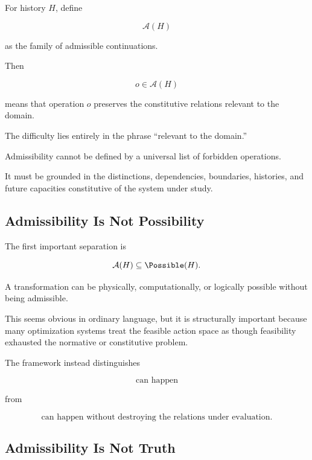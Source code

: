 \documentclass[11pt]{article}
\theoremstyle{remark}
\newcommand{\Adm}{\mathcal{A}}
\begin{document}
For history $H$, define

\begin{equation}
\Adm(H)
\end{equation}

as the family of admissible continuations.

Then

\begin{equation}
o\in\Adm(H)
\end{equation}

means that operation $o$ preserves the constitutive relations relevant to the domain.

The difficulty lies entirely in the phrase ``relevant to the domain.''

Admissibility cannot be defined by a universal list of forbidden operations.

It must be grounded in the distinctions, dependencies, boundaries, histories, and future capacities constitutive of the system under study.

\subsection{Admissibility Is Not Possibility}

The first important separation is

\begin{equation}
\Adm(H)
\subseteq
\Possible(H).
\end{equation}

A transformation can be physically, computationally, or logically possible without being admissible.

This seems obvious in ordinary language, but it is structurally important because many optimization systems treat the feasible action space as though feasibility exhausted the normative or constitutive problem.

The framework instead distinguishes

\begin{equation}
\text{can happen}
\end{equation}

from

\begin{equation}
\text{can happen without destroying the relations under evaluation}.
\end{equation}

\subsection{Admissibility Is Not Truth}
\end{document}
